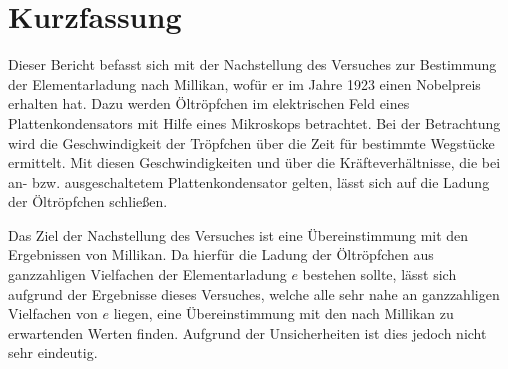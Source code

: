 
\section{Kurzfassung}

Dieser Bericht befasst sich mit der Nachstellung des Versuches zur Bestimmung der Elementarladung nach Millikan, wofür er im Jahre 1923 einen Nobelpreis erhalten hat.
Dazu werden Öltröpfchen im elektrischen Feld eines Plattenkondensators mit Hilfe eines Mikroskops betrachtet.
Bei der Betrachtung wird die Geschwindigkeit der Tröpfchen über die Zeit für bestimmte Wegstücke ermittelt. 
Mit diesen Geschwindigkeiten und über die Kräfteverhältnisse, die bei an- bzw. ausgeschaltetem Plattenkondensator gelten, lässt sich auf die Ladung der Öltröpfchen schließen.

Das Ziel der Nachstellung des Versuches ist eine Übereinstimmung mit den Ergebnissen von Millikan.
Da hierfür die Ladung der Öltröpfchen aus ganzzahligen Vielfachen der Elementarladung $e$ bestehen sollte, lässt sich aufgrund der Ergebnisse dieses Versuches, welche alle sehr nahe an ganzzahligen Vielfachen von $e$ liegen, eine Übereinstimmung mit den nach Millikan zu erwartenden Werten finden. 
Aufgrund der Unsicherheiten ist dies jedoch nicht sehr eindeutig.